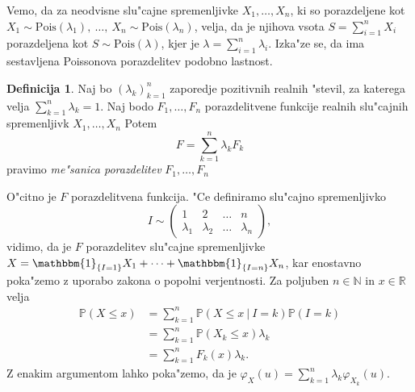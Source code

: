 \documentclass[12pt, a4paper, reqno]{amsart}
\theoremstyle{definition}
\newtheorem{definicija}{Definicija}[section]
\theoremstyle{plain}
\newcommand{\R}{\mathbb{R}}
\newcommand{\N}{\mathbb{N}}
\newcommand{\Prob}{\mathbb{P}}
\newcommand{\1}{\mathds{1}}
\newcommand{\Pois}[1]{\text{Pois}(#1)}
\begin{document}
    Vemo, da za neodvisne slu"cajne spremenljivke $X_1,  \dots, X_n$, ki so porazdeljene 
    kot $X_1\sim\Pois{\lambda_1}, \ \dots, \ X_n\sim\Pois{\lambda_n}$, 
    velja, da je njihova vsota $S = \sum_{i=1}^nX_i$ porazdeljena kot $S\sim\Pois{\lambda}$, kjer je
    $\lambda = \sum_{i=1}^n\lambda_i$.
    Izka"ze se, da ima sestavljena Poissonova porazdelitev 
    podobno lastnost.

    \begin{definicija}
        Naj bo $(\lambda_k)_{k=1}^n$ zaporedje pozitivnih realnih "stevil, za katerega velja 
        $\sum_{k=1}^n\lambda_k = 1$. Naj bodo $F_1, \dots, F_n$ porazdelitvene funkcije
        realnih slu"cajnih spremenljivk $X_1, \dots, X_n$ Potem 
        \begin{equation*}
            F = \sum_{k=1}^n\lambda_kF_k
        \end{equation*}
        pravimo \textit{me"sanica porazdelitev} $F_1, \dots, F_n$
    \end{definicija}
    \noindent
    O"citno je $F$ porazdelitvena funkcija. "Ce definiramo slu"cajno spremenljivko 
    $$
    I \sim 
    \begin{pmatrix}
        1 & 2  & \dots & n\\
        \lambda_1 & \lambda_2  & \dots & \lambda_n
    \end{pmatrix},
    $$
    vidimo, da je $F$ porazdelitev slu"cajne spremenljivke $X = \mathbbm{1}_{\{I = 1\}}X_1 + \cdots + \mathbbm{1}_{\{I = n\}}X_n$, 
    kar enostavno poka"zemo z uporabo zakona o popolni verjentnosti. Za poljuben $n\in\N$ in $x\in\R$ velja 
    \begin{align*}
        \Prob\left(X \leq x\right) 
        &= \sum_{k=1}^n\Prob\left(X \leq x \ \big| \ I = k\right)\Prob\left(I = k\right) \\
        &= \sum_{k=1}^n\Prob\left(X_k \leq x\right)\lambda_k \\
        &= \sum_{k=1}^nF_k(x)\lambda_k.
    \end{align*}
    Z enakim argumentom lahko poka"zemo, da je $\varphi_X(u) = \sum_{k=1}^n\lambda_k\varphi_{X_k}(u)$.
\end{document}
